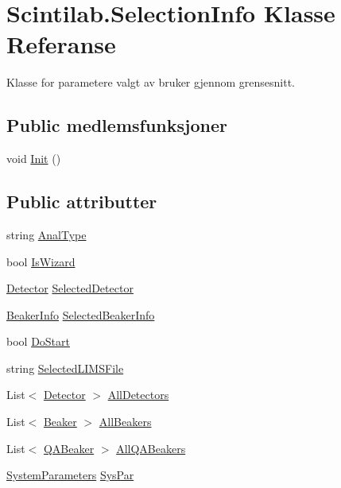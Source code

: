 \hypertarget{class_scintilab_1_1_selection_info}{\section{Scintilab.\+Selection\+Info Klasse Referanse}
\label{class_scintilab_1_1_selection_info}
}


Klasse for parametere valgt av bruker gjennom grensesnitt.  


\subsection*{Public medlemsfunksjoner}
\begin{DoxyCompactItemize}
\item 
void \hyperlink{class_scintilab_1_1_selection_info_a026a3024f472c5a40f805233fd8a82d7}{Init} ()
\end{DoxyCompactItemize}
\subsection*{Public attributter}
\begin{DoxyCompactItemize}
\item 
string \hyperlink{class_scintilab_1_1_selection_info_aba3d0673e0d48ee2e2320fdb18179650}{Anal\+Type}
\item 
bool \hyperlink{class_scintilab_1_1_selection_info_a96e2aa901380fdaf56f62adb7ed4a7c8}{Is\+Wizard}
\item 
\hyperlink{class_scintilab_1_1_detector}{Detector} \hyperlink{class_scintilab_1_1_selection_info_aba0448eddbfd3ea7d133a4a7410e593a}{Selected\+Detector}
\item 
\hyperlink{class_scintilab_1_1_beaker_info}{Beaker\+Info} \hyperlink{class_scintilab_1_1_selection_info_a01bbabc09b9e8b503d1433b25d30c261}{Selected\+Beaker\+Info}
\item 
bool \hyperlink{class_scintilab_1_1_selection_info_a07ceb3649a622337e5f6f40cb63fc35a}{Do\+Start}
\item 
string \hyperlink{class_scintilab_1_1_selection_info_abb0c8ee7bd5b11a26c2d3faa2f358052}{Selected\+L\+I\+M\+S\+File}
\item 
List$<$ \hyperlink{class_scintilab_1_1_detector}{Detector} $>$ \hyperlink{class_scintilab_1_1_selection_info_a23c987113ffb2b75a7253ae95579901c}{All\+Detectors}
\item 
List$<$ \hyperlink{class_scintilab_1_1_beaker}{Beaker} $>$ \hyperlink{class_scintilab_1_1_selection_info_a48b525ccc458db1fbc75243378864922}{All\+Beakers}
\item 
List$<$ \hyperlink{class_scintilab_1_1_q_a_beaker}{Q\+A\+Beaker} $>$ \hyperlink{class_scintilab_1_1_selection_info_a524c6951cb71a220b5142cfd64f244cc}{All\+Q\+A\+Beakers}
\item 
\hyperlink{class_scintilab_1_1_system_parameters}{System\+Parameters} \hyperlink{class_scintilab_1_1_selection_info_a33bd5eca362c1934f22832481248d19d}{Sys\+Par}
\end{DoxyCompactItemize}


